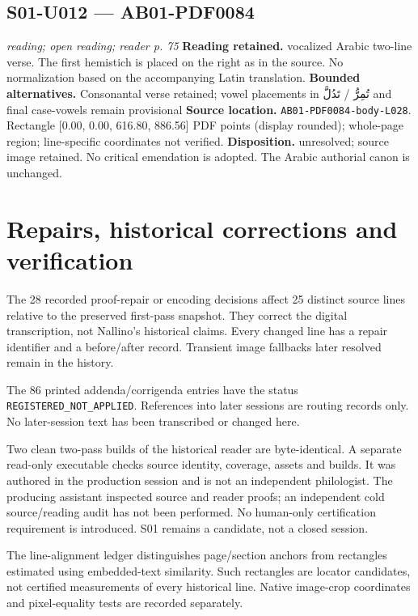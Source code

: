 \documentclass[11pt]{article}
\begin{document}
\par\noindent\begin{minipage}{\linewidth}
\subsection*{S01-U012 — AB01-PDF0084}
\textit{reading; open reading; reader p. 75}
\textbf{Reading retained.} vocalized Arabic two-line verse.
The first hemistich is placed on the right as in the source. No normalization based on the accompanying Latin translation.
\textbf{Bounded alternatives.} Consonantal verse retained; vowel placements in \textarabic{تُمِرُّ} / \textarabic{تَدُلَّ} and final case-vowels remain provisional
\textbf{Source location.} {\small\texttt{AB01-PDF0084-body-L028}}. Rectangle [0.00, 0.00, 616.80, 886.56] PDF points (display rounded); whole-page region; line-specific coordinates not verified.
\textbf{Disposition.} unresolved; source image retained. No critical emendation is adopted. The Arabic authorial canon is unchanged.
\end{minipage}\par\smallskip
\section*{Repairs, historical corrections and verification}
The 28 recorded proof-repair or encoding decisions affect 25 distinct source lines relative to the preserved first-pass snapshot. They correct the digital transcription, not Nallino's historical claims. Every changed line has a repair identifier and a before/after record. Transient image fallbacks later resolved remain in the history.

The 86 printed addenda/corrigenda entries have the status \texttt{REGISTERED\_NOT\_APPLIED}. References into later sessions are routing records only. No later-session text has been transcribed or changed here.

Two clean two-pass builds of the historical reader are byte-identical. A separate read-only executable checks source identity, coverage, assets and builds. It was authored in the production session and is not an independent philologist. The producing assistant inspected source and reader proofs; an independent cold source/reading audit has not been performed. No human-only certification requirement is introduced. S01 remains a candidate, not a closed session.

The line-alignment ledger distinguishes page/section anchors from rectangles estimated using embedded-text similarity. Such rectangles are locator candidates, not certified measurements of every historical line. Native image-crop coordinates and pixel-equality tests are recorded separately.
\end{document}
